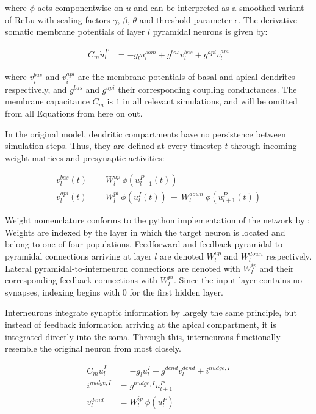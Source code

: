 where $\phi$ acts componentwise on $u$ and can be interpreted as a smoothed variant of ReLu  with scaling
factors $\gamma$, $\beta$, $\theta$ and threshold parameter $\epsilon$. The derivative somatic membrane potentials of
layer $l$ pyramidal neurons is given by:

\begin{align}
  C_m \dot{u}_l^P & = - g_l u_l^{som} + g^{bas} v_l^{bas} + g^{api} v_l^{api}
\end{align}

where $v_i^{bas}$ and $v_i^{api}$ are the membrane potentials of basal and apical dendrites respectively, and $g^{bas}$
and $g^{api}$ their corresponding coupling conductances. The membrane capacitance $C_m$ is $1$ in all relevant
simulations, and will be omitted from all Equations from here on out.


In the original model, dendritic compartments have no persistence between simulation steps. Thus, they are defined at
every timestep $t$ through incoming weight matrices and presynaptic activities:

\begin{align}
  v_l^{bas}(t) & = W_l^{up} \ \phi(u_{l-1}^P(t))                                     \\
  v_l^{api}(t) & =  W_l^{pi} \ \phi(u_l^I(t)) \ + \  W_l^{down} \ \phi(u_{l+1}^P(t))
\end{align}

Weight nomenclature conforms to the python implementation of the network by \cite{Haider2021}; Weights are indexed by
the layer in which the target neuron is located and belong to one of four populations. Feedforward and feedback
pyramidal-to-pyramidal connections arriving at layer $l$ are denoted $W_l^{up}$ and $W_l^{down}$ respectively. Lateral
pyramidal-to-interneuron connections are denoted with $W_l^{ip}$ and their corresponding feedback connections with
$W_l^{pi}$. Since the input layer contains no synapses, indexing begins with $0$ for the first hidden layer. \newline

Interneurons integrate synaptic information by largely the same principle, but instead of feedback information arriving
at the apical compartment, it is integrated directly into the soma. Through this, interneurons functionally resemble the
original neuron from \cite{urbanczik2014learning} most closely.

\begin{align}
  C_m \dot{u}_l^I & = - g_l u_l^{I} + g^{dend} v_l^{dend} + i^{nudge, I}\label{eq-intn-dynamics} \\
  i^{nudge, I}    & = g^{nudge, I} u_{l+1}^P                                                     \\
  v_l^{dend}      & = W_l^{ip} \ \phi(u_{l}^P)
\end{align}

